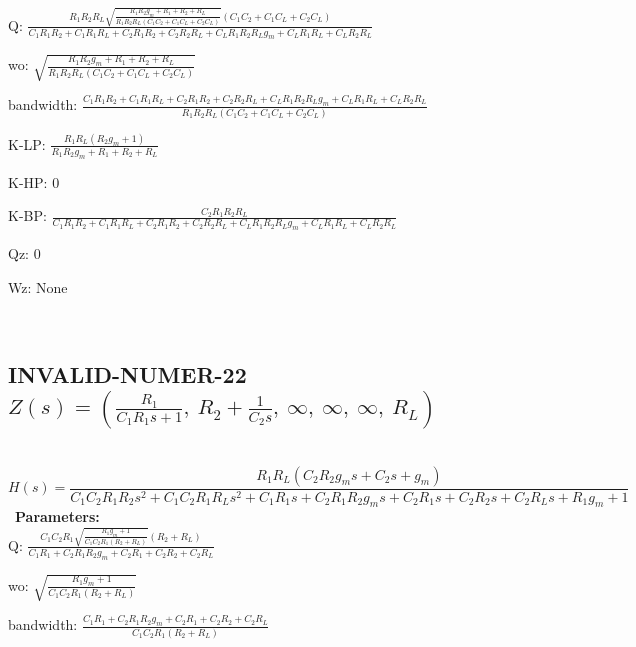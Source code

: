 \documentclass{article}
\begin{document}
Q: $\frac{R_{1} R_{2} R_{L} \sqrt{\frac{R_{1} R_{2} g_{m} + R_{1} + R_{2} + R_{L}}{R_{1} R_{2} R_{L} \left(C_{1} C_{2} + C_{1} C_{L} + C_{2} C_{L}\right)}} \left(C_{1} C_{2} + C_{1} C_{L} + C_{2} C_{L}\right)}{C_{1} R_{1} R_{2} + C_{1} R_{1} R_{L} + C_{2} R_{1} R_{2} + C_{2} R_{2} R_{L} + C_{L} R_{1} R_{2} R_{L} g_{m} + C_{L} R_{1} R_{L} + C_{L} R_{2} R_{L}}$\ 

wo: $\sqrt{\frac{R_{1} R_{2} g_{m} + R_{1} + R_{2} + R_{L}}{R_{1} R_{2} R_{L} \left(C_{1} C_{2} + C_{1} C_{L} + C_{2} C_{L}\right)}}$\ 

bandwidth: $\frac{C_{1} R_{1} R_{2} + C_{1} R_{1} R_{L} + C_{2} R_{1} R_{2} + C_{2} R_{2} R_{L} + C_{L} R_{1} R_{2} R_{L} g_{m} + C_{L} R_{1} R_{L} + C_{L} R_{2} R_{L}}{R_{1} R_{2} R_{L} \left(C_{1} C_{2} + C_{1} C_{L} + C_{2} C_{L}\right)}$\ 

K-LP: $\frac{R_{1} R_{L} \left(R_{2} g_{m} + 1\right)}{R_{1} R_{2} g_{m} + R_{1} + R_{2} + R_{L}}$\ 

K-HP: $0$\ 

K-BP: $\frac{C_{2} R_{1} R_{2} R_{L}}{C_{1} R_{1} R_{2} + C_{1} R_{1} R_{L} + C_{2} R_{1} R_{2} + C_{2} R_{2} R_{L} + C_{L} R_{1} R_{2} R_{L} g_{m} + C_{L} R_{1} R_{L} + C_{L} R_{2} R_{L}}$\ 

Qz: $0$\ 

Wz: $\text{None}$\ 

\ 

\subsection{INVALID-NUMER-22 $Z(s) = \left( \frac{R_{1}}{C_{1} R_{1} s + 1}, \  R_{2} + \frac{1}{C_{2} s}, \  \infty, \  \infty, \  \infty, \  R_{L}\right)$ } \ 
\textbf{\[H(s) = \frac{R_{1} R_{L} \left(C_{2} R_{2} g_{m} s + C_{2} s + g_{m}\right)}{C_{1} C_{2} R_{1} R_{2} s^{2} + C_{1} C_{2} R_{1} R_{L} s^{2} + C_{1} R_{1} s + C_{2} R_{1} R_{2} g_{m} s + C_{2} R_{1} s + C_{2} R_{2} s + C_{2} R_{L} s + R_{1} g_{m} + 1}\] } \ 
\textbf{Parameters:}\\ 

Q: $\frac{C_{1} C_{2} R_{1} \sqrt{\frac{R_{1} g_{m} + 1}{C_{1} C_{2} R_{1} \left(R_{2} + R_{L}\right)}} \left(R_{2} + R_{L}\right)}{C_{1} R_{1} + C_{2} R_{1} R_{2} g_{m} + C_{2} R_{1} + C_{2} R_{2} + C_{2} R_{L}}$\ 

wo: $\sqrt{\frac{R_{1} g_{m} + 1}{C_{1} C_{2} R_{1} \left(R_{2} + R_{L}\right)}}$\ 

bandwidth: $\frac{C_{1} R_{1} + C_{2} R_{1} R_{2} g_{m} + C_{2} R_{1} + C_{2} R_{2} + C_{2} R_{L}}{C_{1} C_{2} R_{1} \left(R_{2} + R_{L}\right)}$\ 
\end{document}
